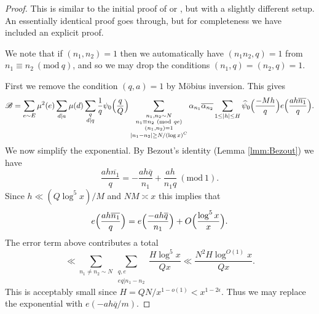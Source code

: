 \documentclass[10pt]{amsart}
\theoremstyle{plain}
\numberwithin{equation}{section}
\newcommand{\Mod}[1]{\ (\mathrm{mod}\ #1)}
\renewcommand{\hat}[1]{\widehat #1}
\begin{document}
%
%
%
%
\begin{proof}
This is similar to the initial proof of \cite[Theorem 4]{BFI2} or \cite{FouvryRadziwill}, but with a slightly different setup. An essentially identical proof goes through, but for completeness we have included an explicit proof.

 We note that if $(n_1,n_2)=1$ then we automatically have $(n_1n_2,q)=1$ from $n_1\equiv n_2\Mod{q}$, and so we may drop the conditions $(n_1,q)=(n_2,q)=1$.
 
 First we remove the condition $(q,a)=1$ by M\"obius inversion. This gives
\[
\mathscr{B}=\sum_{e\sim E}\mu^2(e)\sum_{d|a}\mu(d)\sum_{\substack{q\\  d|q}}\frac{1}{q}\psi_0\Bigl(\frac{q}{Q}\Bigr)\sum_{\substack{n_1,n_2\sim N\\ n_1\equiv n_2\Mod{q e}\\ (n_1,n_2)=1\\ |n_1-n_2|\ge N/(\log{x})^C}}\alpha_{n_1}\overline{\alpha_{n_2}}\sum_{1\le |h|\le H}\hat{\psi_0}\Bigl(\frac{-M h}{q}\Bigr)e\Bigl(\frac{ah\overline{n_1}}{q}\Bigr).
\]
We now simplify the exponential. By Bezout's identity (Lemma \ref{lmm:Bezout}) we have
\[
\frac{ah \overline{n_1}}{q}=-\frac{ah \overline{q}}{n_1}+\frac{a h}{n_1 q}\Mod{1}.
\]
Since $h\ll (Q\log^5{x})/M$ and $NM \asymp x$ this implies that
\[
e\Bigl(\frac{ah \overline{n_1}}{q}\Bigr)=e\Bigl(\frac{-ah \overline{q}}{n_1}\Bigr)+O\Bigl(\frac{\log^5{x}}{x}\Bigr).
\]
The error term above contributes a total
\[
\ll \sum_{n_1\ne n_2\sim N}\sum_{\substack{q,e\\ eq|n_1-n_2}}\frac{H\log^5{x}}{Qx}\ll \frac{N^2 H\log^{O(1)}{x}}{Q x}.
\]
This is acceptably small since $H=Q N/x^{1-o(1)}<x^{1-2\epsilon}$. Thus we may replace the exponential with $e(-ah\overline{q}/m)$.


\end{proof}
\end{document}
